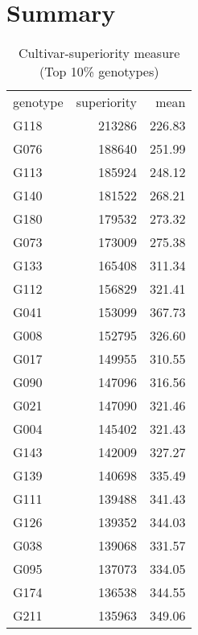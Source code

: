 \documentclass[a4paper,11pt]{article}\usepackage[]{graphicx}\usepackage[]{color}
\begin{document}
\section{Summary}
\begin{table}[ht]
\begin{flushleft}
\caption{Cultivar-superiority measure (Top 10\% genotypes)} 
\label{cultSup}
\begin{tabular}{lrr}
 genotype & superiority & mean \\ 
 G118 & 213286 & 226.83 \\ 
  G076 & 188640 & 251.99 \\ 
  G113 & 185924 & 248.12 \\ 
  G140 & 181522 & 268.21 \\ 
  G180 & 179532 & 273.32 \\ 
  G073 & 173009 & 275.38 \\ 
  G133 & 165408 & 311.34 \\ 
  G112 & 156829 & 321.41 \\ 
  G041 & 153099 & 367.73 \\ 
  G008 & 152795 & 326.60 \\ 
  G017 & 149955 & 310.55 \\ 
  G090 & 147096 & 316.56 \\ 
  G021 & 147090 & 321.46 \\ 
  G004 & 145402 & 321.43 \\ 
  G143 & 142009 & 327.27 \\ 
  G139 & 140698 & 335.49 \\ 
  G111 & 139488 & 341.43 \\ 
  G126 & 139352 & 344.03 \\ 
  G038 & 139068 & 331.57 \\ 
  G095 & 137073 & 334.05 \\ 
  G174 & 136538 & 344.55 \\ 
  G211 & 135963 & 349.06 \\ 
  \end{tabular}
\end{flushleft}
\end{table}
\end{document}
